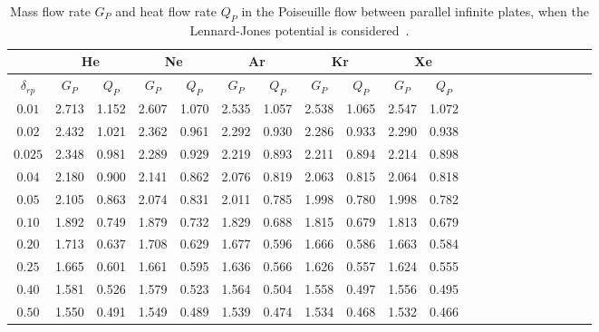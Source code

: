 







\begin{table}
	\caption{Mass flow rate $G_P$ and heat flow rate $Q_P$ in the Poiseuille flow between parallel infinite plates, when the Lennard-Jones potential is considered~\cite{wuPoF2015}.   }
	\centering
	\begin{tabular}{ccccccccccccccccccccc}
		\hline 
		& \multicolumn{2}{c}{He}
		& \multicolumn{2}{c}{Ne}  
		& \multicolumn{2}{c}{Ar} 
		& \multicolumn{2}{c}{Kr}  
		& \multicolumn{2}{c}{Xe} \\ 
		\hline 
$\delta_{rp}$ & $G_P$  &$Q_P$ & $G_P$ &$Q_P$  & $G_P$  &$Q_P$  &$G_P$ &$Q_P$  & $G_P$  & $Q_P$   \\ \hline 
		$0.01$ & 2.713& 1.152& 2.607& 1.070& 2.535& 1.057& 2.538& 1.065& 2.547& 1.072  \\
		$0.02$ & 2.432& 1.021& 2.362& 0.961& 2.292& 0.930& 2.286& 0.933& 2.290& 0.938  \\
		$0.025$ &2.348& 0.981& 2.289& 0.929& 2.219& 0.893& 2.211& 0.894& 2.214& 0.898  \\
		$0.04$ & 2.180& 0.900& 2.141& 0.862& 2.076& 0.819& 2.063& 0.815& 2.064& 0.818  \\
		$0.05$ & 2.105& 0.863& 2.074& 0.831& 2.011& 0.785& 1.998& 0.780& 1.998& 0.782  \\
		$0.10$ & 1.892& 0.749& 1.879& 0.732& 1.829& 0.688& 1.815& 0.679& 1.813& 0.679  \\
		$0.20$ & 1.713& 0.637& 1.708& 0.629& 1.677& 0.596& 1.666& 0.586& 1.663& 0.584  \\
		$0.25$ &1.665 & 0.601& 1.661& 0.595& 1.636& 0.566& 1.626& 0.557& 1.624& 0.555  \\
		$0.40$ & 1.581& 0.526& 1.579& 0.523& 1.564& 0.504& 1.558& 0.497& 1.556& 0.495  \\
		$0.50$ & 1.550& 0.491& 1.549& 0.489& 1.539& 0.474& 1.534& 0.468& 1.532& 0.466  \\

\end{tabular}
\end{table}
